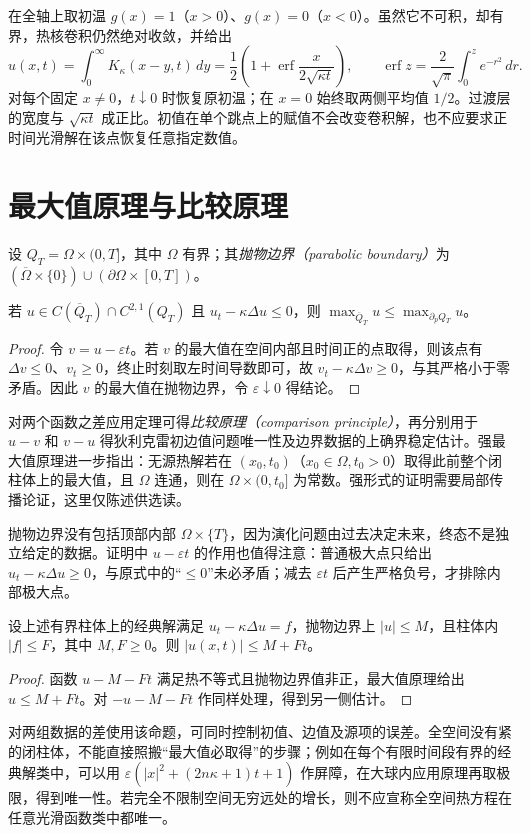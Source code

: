 \begin{example}[从阶跃温度到平滑过渡层]
在全轴上取初温 $g(x)=1$（$x>0$）、$g(x)=0$（$x<0$）。虽然它不可积，却有界，热核卷积仍然绝对收敛，并给出
\[
 u(x,t)=\int_0^\infty K_\kappa(x-y,t)\,dy
 =\frac12\left(1+\operatorname{erf}\frac{x}{2\sqrt{\kappa t}}\right),
 \qquad \operatorname{erf}z=\frac2{\sqrt\pi}\int_0^z e^{-r^2}\,dr.
\]
对每个固定 $x\ne0$，$t\downarrow0$ 时恢复原初温；在 $x=0$ 始终取两侧平均值 $1/2$。过渡层的宽度与 $\sqrt{\kappa t}$ 成正比。初值在单个跳点上的赋值不会改变卷积解，也不应要求正时间光滑解在该点恢复任意指定数值。
\end{example}

\section{最大值原理与比较原理}
设 $Q_T=\Omega\times(0,T]$，其中 $\Omega$ 有界；其\emph{抛物边界（parabolic boundary）}为 $(\overline\Omega\times\{0\})\cup(\partial\Omega\times[0,T])$。
\begin{theorem}[弱最大值原理]
若 $u\in C(\overline Q_T)\cap C^{2,1}(Q_T)$ 且 $u_t-\kappa\Delta u\le0$，则 $\max_{\overline Q_T}u\le\max_{\partial_pQ_T}u$。
\end{theorem}
\begin{proof}
令 $v=u-\varepsilon t$。若 $v$ 的最大值在空间内部且时间正的点取得，则该点有 $\Delta v\le0$、$v_t\ge0$，终止时刻取左时间导数即可，故 $v_t-\kappa\Delta v\ge0$，与其严格小于零矛盾。因此 $v$ 的最大值在抛物边界，令 $\varepsilon\downarrow0$ 得结论。
\end{proof}
对两个函数之差应用定理可得\emph{比较原理（comparison principle）}，再分别用于 $u-v$ 和 $v-u$ 得狄利克雷初边值问题唯一性及边界数据的上确界稳定估计。强最大值原理进一步指出：无源热解若在 $(x_0,t_0)$（$x_0\in\Omega,t_0>0$）取得此前整个闭柱体上的最大值，且 $\Omega$ 连通，则在 $\Omega\times(0,t_0]$ 为常数。强形式的证明需要局部传播论证，这里仅陈述供选读。

抛物边界没有包括顶部内部 $\Omega\times\{T\}$，因为演化问题由过去决定未来，终态不是独立给定的数据。证明中 $u-\varepsilon t$ 的作用也值得注意：普通极大点只给出 $u_t-\kappa\Delta u\ge0$，与原式中的“$\le0$”未必矛盾；减去 $\varepsilon t$ 后产生严格负号，才排除内部极大点。

\begin{proposition}[有源问题的振幅估计]
设上述有界柱体上的经典解满足 $u_t-\kappa\Delta u=f$，抛物边界上 $|u|\le M$，且柱体内 $|f|\le F$，其中 $M,F\ge0$。则 $|u(x,t)|\le M+Ft$。
\end{proposition}
\begin{proof}
函数 $u-M-Ft$ 满足热不等式且抛物边界值非正，最大值原理给出 $u\le M+Ft$。对 $-u-M-Ft$ 作同样处理，得到另一侧估计。
\end{proof}
对两组数据的差使用该命题，可同时控制初值、边值及源项的误差。全空间没有紧的闭柱体，不能直接照搬“最大值必取得”的步骤；例如在每个有限时间段有界的经典解类中，可以用 $\varepsilon(|x|^2+(2n\kappa+1)t+1)$ 作屏障，在大球内应用原理再取极限，得到唯一性。若完全不限制空间无穷远处的增长，则不应宣称全空间热方程在任意光滑函数类中都唯一。

